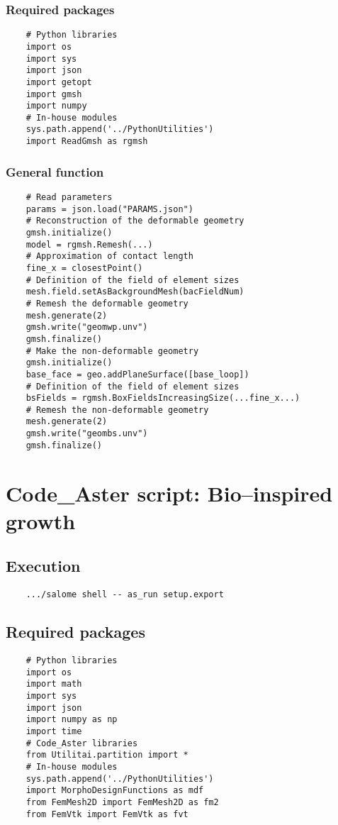\documentclass{article}
\begin{document}
\subsubsection{Required packages}
\begin{verbatim}
    # Python libraries
    import os
    import sys
    import json
    import getopt
    import gmsh
    import numpy
    # In-house modules
    sys.path.append('../PythonUtilities')
    import ReadGmsh as rgmsh
\end{verbatim}
\subsubsection{General function}
\begin{verbatim}
    # Read parameters
    params = json.load("PARAMS.json")
    # Reconstruction of the deformable geometry
    gmsh.initialize()
    model = rgmsh.Remesh(...)
    # Approximation of contact length
    fine_x = closestPoint()
    # Definition of the field of element sizes
    mesh.field.setAsBackgroundMesh(bacFieldNum)
    # Remesh the deformable geometry
    mesh.generate(2)
    gmsh.write("geomwp.unv")
    gmsh.finalize()
    # Make the non-deformable geometry
    gmsh.initialize()
    base_face = geo.addPlaneSurface([base_loop])
    # Definition of the field of element sizes
    bsFields = rgmsh.BoxFieldsIncreasingSize(...fine_x...)
    # Remesh the non-deformable geometry
    mesh.generate(2)
    gmsh.write("geombs.unv")
    gmsh.finalize()
\end{verbatim}

\section{Code\_Aster script: Bio--inspired growth}
\subsection{Execution}
\begin{verbatim}
    .../salome shell -- as_run setup.export
\end{verbatim}
\subsection{Required packages}
\begin{verbatim}
    # Python libraries
    import os
    import math
    import sys
    import json
    import numpy as np
    import time
    # Code_Aster libraries
    from Utilitai.partition import *
    # In-house modules
    sys.path.append('../PythonUtilities')
    import MorphoDesignFunctions as mdf
    from FemMesh2D import FemMesh2D as fm2
    from FemVtk import FemVtk as fvt
\end{verbatim}
\end{document}
